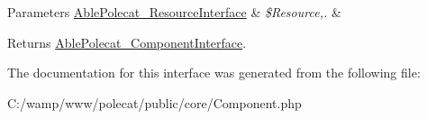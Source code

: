 \begin{DoxyParams}[1]{Parameters}
\hyperlink{interface_able_polecat___resource_interface}{Able\+Polecat\+\_\+\+Resource\+Interface} & {\em \$\+Resource,.} & \\
\hline
\end{DoxyParams}
\begin{DoxyReturn}{Returns}
\hyperlink{interface_able_polecat___component_interface}{Able\+Polecat\+\_\+\+Component\+Interface}. 
\end{DoxyReturn}


The documentation for this interface was generated from the following file\+:\begin{DoxyCompactItemize}
\item 
C\+:/wamp/www/polecat/public/core/Component.\+php\end{DoxyCompactItemize}
